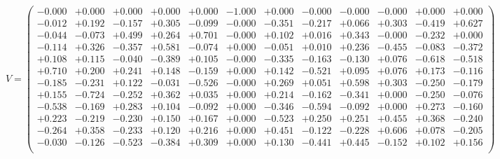 \documentclass[9pt]{article}
\theoremstyle{plain}
\theoremstyle{definition}
\theoremstyle{remark}
\numberwithin{equation}{section}
\begin{document}
$V = \left(
\begin{array}{
cccccccccccc}
-0.000 & +0.000 & +0.000 & +0.000 & +0.000 & -1.000 & +0.000 & -0.000 & -0.000 & -0.000 & +0.000 & +0.000 \\
-0.012 & +0.192 & -0.157 & +0.305 & -0.099 & -0.000 & -0.351 & -0.217 & +0.066 & +0.303 & -0.419 & +0.627 \\
-0.044 & -0.073 & +0.499 & +0.264 & +0.701 & -0.000 & +0.102 & +0.016 & +0.343 & -0.000 & -0.232 & +0.000 \\
-0.114 & +0.326 & -0.357 & +0.581 & -0.074 & +0.000 & -0.051 & +0.010 & +0.236 & -0.455 & -0.083 & -0.372 \\
+0.108 & +0.115 & -0.040 & -0.389 & +0.105 & -0.000 & -0.335 & -0.163 & -0.130 & +0.076 & -0.618 & -0.518 \\
+0.710 & +0.200 & +0.241 & +0.148 & -0.159 & +0.000 & +0.142 & -0.521 & +0.095 & +0.076 & +0.173 & -0.116 \\
-0.185 & -0.231 & +0.122 & -0.031 & -0.526 & -0.000 & +0.269 & +0.051 & +0.598 & +0.303 & -0.250 & -0.179 \\
+0.155 & -0.724 & -0.252 & +0.362 & +0.035 & +0.000 & +0.214 & -0.162 & -0.341 & +0.000 & -0.250 & -0.076 \\
-0.538 & -0.169 & +0.283 & +0.104 & -0.092 & +0.000 & -0.346 & -0.594 & -0.092 & +0.000 & +0.273 & -0.160 \\
+0.223 & -0.219 & -0.230 & +0.150 & +0.167 & +0.000 & -0.523 & +0.250 & +0.251 & +0.455 & +0.368 & -0.240 \\
-0.264 & +0.358 & -0.233 & +0.120 & +0.216 & +0.000 & +0.451 & -0.122 & -0.228 & +0.606 & +0.078 & -0.205 \\
-0.030 & -0.126 & -0.523 & -0.384 & +0.309 & +0.000 & +0.130 & -0.441 & +0.445 & -0.152 & +0.102 & +0.156 \\
\end{array}
\right)$ \newline 
\end{document}
